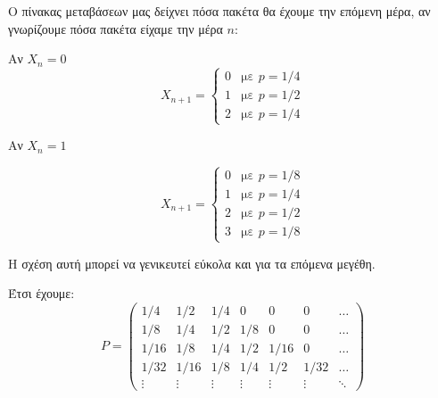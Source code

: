 \documentclass[11pt,a4paper]{article}
\begin{document}
Ο πίνακας μεταβάσεων μας δείχνει πόσα πακέτα θα έχουμε την επόμενη μέρα, αν γνωρίζουμε πόσα πακέτα είχαμε την μέρα $n$:

Αν $X_n = 0$
\begin{equation*}
    X_{n+1} =
    \begin{cases}
        0 & \text{με $p=1/4$} \\
        1 & \text{με $p=1/2$} \\
        2 & \text{με $p=1/4$}
    \end{cases}
\end{equation*}

Αν $X_n = 1$

\begin{equation*}
    X_{n+1} =
    \begin{cases}
        0 & \text{με $p=1/8$} \\
        1 & \text{με $p=1/4$} \\
        2 & \text{με $p=1/2$} \\
        3 & \text{με $p=1/8$}
    \end{cases}
\end{equation*}

Η σχέση αυτή μπορεί να γενικευτεί εύκολα και για τα επόμενα μεγέθη.

Έτσι έχουμε:
\begin{equation*}
    P =
    \begin{pmatrix}
        1/4    & 1/2    & 1/4    & 0      & 0      & 0      & \dots  \\
        1/8    & 1/4    & 1/2    & 1/8    & 0      & 0      & \dots  \\
        1/16   & 1/8    & 1/4    & 1/2    & 1/16   & 0      & \dots  \\
        1/32   & 1/16   & 1/8    & 1/4    & 1/2    & 1/32   & \dots  \\
        \vdots & \vdots & \vdots & \vdots & \vdots & \vdots & \ddots
    \end{pmatrix}
\end{equation*}
\end{document}
